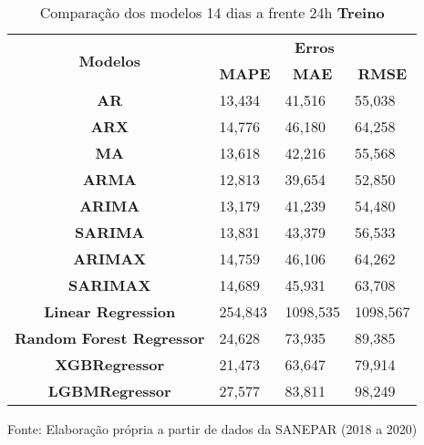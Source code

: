 \begin{table}[H]
	\centering
	\caption{Comparação dos modelos 14 dias a frente 24h \textbf{Treino} }\label{tb:30-24trn}
	\begin{tabular}{@{}clll@{}}
		\toprule
		\multirow{2}{*}{\textbf{Modelos}} & \multicolumn{3}{c}{\textbf{Erros}}                                                                       \\ \cmidrule(l){2-4} 
		& \multicolumn{1}{c}{\textbf{MAPE}} & \multicolumn{1}{c}{\textbf{MAE}} & \multicolumn{1}{c}{\textbf{RMSE}} \\ \hline
\textbf{AR}                       & 13,434                            & 41,516                           & 55,038                            \\
\textbf{ARX}                      & 14,776                            & 46,180                           & 64,258                            \\
\textbf{MA}                       & 13,618                            & 42,216                           & 55,568                            \\
\textbf{ARMA}                     & 12,813                            & 39,654                           & 52,850                            \\
\textbf{ARIMA}                    & 13,179                            & 41,239                           & 54,480                            \\
\textbf{SARIMA}                   & 13,831                            & 43,379                           & 56,533                            \\
\textbf{ARIMAX}                   & 14,759                            & 46,106                           & 64,262                            \\
\textbf{SARIMAX}                  & 14,689                            & 45,931                           & 63,708                            \\
\textbf{Linear Regression}        & 254,843                           & 1098,535                         & 1098,567                          \\
\textbf{Random Forest Regressor}  & 24,628                            & 73,935                           & 89,385                            \\
\textbf{XGBRegressor}             & 21,473                            & 63,647                           & 79,914                            \\
\textbf{LGBMRegressor}            & 27,577                            & 83,811                           & 98,249                            \\ \bottomrule
	\end{tabular}

Fonte: Elaboração própria a partir de dados da SANEPAR (2018 a 2020)
\end{table}

